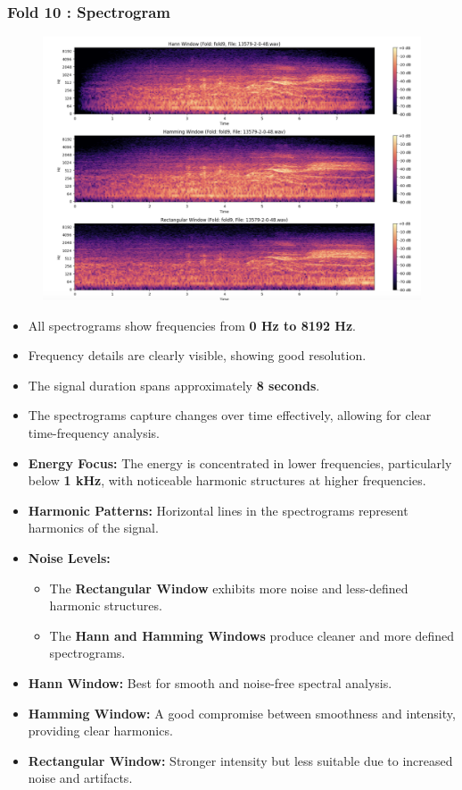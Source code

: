 \documentclass[a4paper,12pt]{article}
\begin{document}
    \subsubsection{Fold 10 : Spectrogram}
    \begin{figure}[H]
        \centering
        \includegraphics[width=1\linewidth]{Fold10.png}
    \end{figure}
    \begin{itemize}
        \item All spectrograms show frequencies from  \textbf{0 Hz to 8192 Hz}.
        \item Frequency details are clearly visible, showing good resolution.
        \item The signal duration spans approximately  \textbf{8 seconds}.
        \item The spectrograms capture changes over time effectively, allowing for clear time-frequency analysis.
        \item \textbf{Energy Focus:} The energy is concentrated in lower frequencies, particularly below \textbf{1 kHz}, with noticeable harmonic structures at higher frequencies.
        \item \textbf{Harmonic Patterns:} Horizontal lines in the spectrograms represent harmonics of the signal.
        \item \textbf{Noise Levels:}
            \begin{itemize}
                \item The \textbf{Rectangular Window} exhibits more noise and less-defined harmonic structures.
                \item The \textbf{Hann and Hamming Windows} produce cleaner and more defined spectrograms.
            \end{itemize}
        \item \textbf{Hann Window:} Best for smooth and noise-free spectral analysis.
        \item \textbf{Hamming Window:} A good compromise between smoothness and intensity, providing clear harmonics.
        \item \textbf{Rectangular Window:} Stronger intensity but less suitable due to increased noise and artifacts.
    \end{itemize}
\newpage
\end{document}
